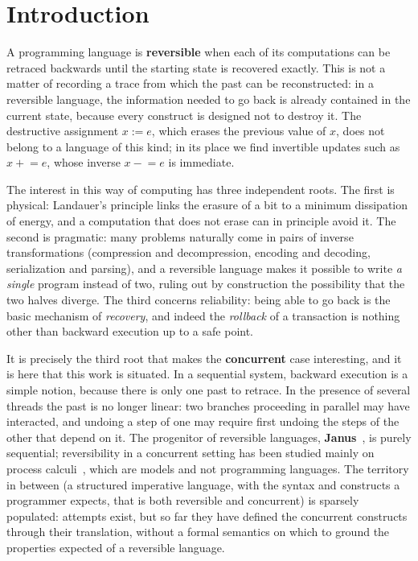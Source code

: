 
\chapter{Introduction}
\label{sec:intro}

A programming language is \textbf{reversible} when each of its computations
can be retraced backwards until the starting state is recovered exactly. This is
not a matter of recording a trace from which the past can be reconstructed: in a
reversible language, the information needed to go back is already contained in
the current state, because every construct is designed not to destroy it. The
destructive assignment $x := e$, which erases the previous value of $x$, does
not belong to a language of this kind; in its place we find invertible updates
such as $x \mathrel{+}= e$, whose inverse $x \mathrel{-}= e$ is immediate.

The interest in this way of computing has three independent roots. The first is
physical: Landauer's principle links the erasure of a bit to a minimum
dissipation of energy, and a computation that does not erase can in principle
avoid it. The second is pragmatic: many problems naturally come in pairs of
inverse transformations (compression and decompression, encoding and decoding,
serialization and parsing), and a reversible language makes it possible to write
\emph{a single} program instead of two, ruling out by construction the
possibility that the two halves diverge. The third concerns reliability: being
able to go back is the basic mechanism of \emph{recovery}, and indeed the
\emph{rollback} of a transaction is nothing other than backward execution up to
a safe point.

\medskip
\noindent
It is precisely the third root that makes the \textbf{concurrent} case
interesting, and it is here that this work is situated. In a sequential system,
backward execution is a simple notion, because there is only one past to retrace.
In the presence of several threads the past is no longer linear: two branches
proceeding in parallel may have interacted, and undoing a step of one may
require first undoing the steps of the other that depend on it. The progenitor
of reversible languages, \textbf{Janus}~\cite{YokoyamaGluck2007}, is purely
sequential; reversibility in a concurrent setting has been studied mainly on
process calculi~\cite{LaneseMezzinaSchmittStefani2011,%
LaneseLienhardtMezzinaSchmittStefani2013}, which are models and not programming
languages. The territory in between (a structured imperative language, with the
syntax and constructs a programmer expects, that is both reversible and
concurrent) is sparsely populated: attempts exist, but so far they have defined
the concurrent constructs through their translation, without a formal semantics
on which to ground the properties expected of a reversible language.

